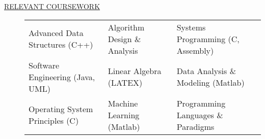 \documentclass[12pt]{article}
\begin{document}
\begin{description}
\begin{tabular}{l|l}
            \end{tabular}

        \item[\underline{RELEVANT COURSEWORK}]\hfill

            \begin{tabular}{l|l|l}
                Advanced Data Structures (C++)& Algorithm Design \& Analysis & Systems Programming (C, Assembly)\\
             Software Engineering (Java, UML) & Linear Algebra (LATEX) &  Data Analysis \& Modeling (Matlab) \\
                  Operating System Principles (C) & Machine Learning (Matlab) & Programming Languages \& Paradigms\\
            \end{tabular}


\end{description}
\end{document}
